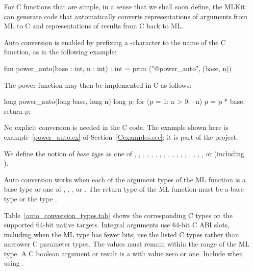 \documentclass[12pt]{book}
\begin{document}
%
%
For C functions that are simple, in a sense that we shall soon define, the MLKit
can generate code that automatically converts representations of arguments from
ML to C and representations of results from C back to ML.

Auto conversion is enabled by prefixing a -character to the name of the C
function, as in the following example:
\begin{smlcode}
  fun power_auto(base : int, n : int) : int =
    prim ("@power_auto", (base, n))
\end{smlcode}

\noindent
The power function may then be implemented in C as follows:
\begin{scriptcode}
  long power_auto(long base, long n) {
    long p;
    for (p = 1; n > 0; --n) p = p * base;
    return p;
  }
\end{scriptcode}

\noindent
No explicit conversion is needed in the C code. The example shown here is
example~\ref{power_auto.ex} of Section~\ref{Cexamples.sec}; it is part of the
 project.

We define the notion of \emph{base type} as one of , ,
, , , , ,
, , , ,
, , , , ,
, or  (including ).

Auto conversion works when each of the argument types of the ML function is a
base type or one of , , ,
or . The return type of the ML function must be a base type
or the type .

Table~\ref{auto_conversion_types.tab} shows the corresponding C types on
the supported 64-bit native targets. Integral arguments use 64-bit C ABI
slots, including when the ML type has fewer bits; use the listed C types
rather than narrower C parameter types. The values must remain within the
range of the ML type. A C boolean argument or result is a  with
value zero or one. Include  when using .
\end{document}
